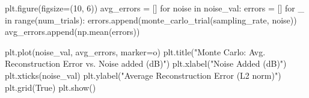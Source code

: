 \documentclass[
  letterpaper,
  DIV=11,
  numbers=noendperiod]{scrartcl}
\newenvironment{Shaded}{\begin{snugshade}}{\end{snugshade}}
\newcommand{\BuiltInTok}[1]{\textcolor[rgb]{0.40,0.85,0.94}{#1}}
\newcommand{\ControlFlowTok}[1]{\textcolor[rgb]{0.98,0.15,0.45}{#1}}
\newcommand{\DecValTok}[1]{\textcolor[rgb]{0.68,0.51,1.00}{#1}}
\newcommand{\KeywordTok}[1]{\textcolor[rgb]{0.98,0.15,0.45}{#1}}
\newcommand{\NormalTok}[1]{\textcolor[rgb]{0.97,0.97,0.95}{#1}}
\newcommand{\OperatorTok}[1]{\textcolor[rgb]{0.97,0.97,0.95}{#1}}
\newcommand{\StringTok}[1]{\textcolor[rgb]{0.90,0.86,0.45}{#1}}
\newcommand{\VariableTok}[1]{\textcolor[rgb]{0.97,0.97,0.95}{#1}}
\begin{document}
\begin{Shaded}
\begin{Highlighting}[]
\NormalTok{plt.figure(figsize}\OperatorTok{=}\NormalTok{(}\DecValTok{10}\NormalTok{, }\DecValTok{6}\NormalTok{))}
\NormalTok{avg\_errors }\OperatorTok{=}\NormalTok{ []}
\ControlFlowTok{for}\NormalTok{ noise }\KeywordTok{in}\NormalTok{ noise\_val:}
\NormalTok{    errors }\OperatorTok{=}\NormalTok{ []}
    \ControlFlowTok{for}\NormalTok{ \_ }\KeywordTok{in} \BuiltInTok{range}\NormalTok{(num\_trials):}
\NormalTok{        errors.append(monte\_carlo\_trial(sampling\_rate, noise))}
\NormalTok{    avg\_errors.append(np.mean(errors))  }

\NormalTok{plt.plot(noise\_val, avg\_errors, marker}\OperatorTok{=}\StringTok{\textquotesingle{}o\textquotesingle{}}\NormalTok{)}
\NormalTok{plt.title(}\StringTok{"Monte Carlo: Avg. Reconstruction Error vs. Noise added (dB)"}\NormalTok{)}
\NormalTok{plt.xlabel(}\StringTok{"Noise Added (dB)"}\NormalTok{)}
\NormalTok{plt.xticks(noise\_val)}
\NormalTok{plt.ylabel(}\StringTok{"Average Reconstruction Error (L2 norm)"}\NormalTok{)}
\NormalTok{plt.grid(}\VariableTok{True}\NormalTok{)}
\NormalTok{plt.show()}
\end{Highlighting}
\end{Shaded}
\end{document}

